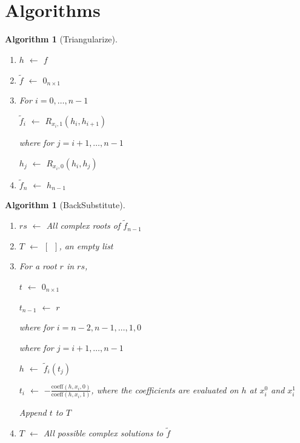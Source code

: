 \documentclass{article}%
\newtheorem{algorithm}[theorem]{Algorithm}
\begin{document}
\section{Algorithms}

\begin{algorithm}
[Triangularize]
\phantom{L}
\begin{enumerate}
    \item $h$ $\leftarrow$ $f$
    \item $\tilde{f}$ $\leftarrow$ $0_{n\times 1}$
    \item For $i=0,\dots,n-1$

    $\tilde{f}_i$ $\leftarrow$ $R_{x_i,1}(h_i,h_{i+1})$
    
    \hspace{25}where for $j=i+1,\dots,n-1$
    
    \hspace{25}$h_j$ $\leftarrow$ $R_{x_i,0}(h_i,h_j)$
    \item $\tilde{f}_n$ $\leftarrow$ $h_{n-1}$
\end{enumerate}
\end{algorithm}

\begin{algorithm}
[BackSubstitute]
\phantom{L}
\begin{enumerate}
    \item $rs$ $\leftarrow$ All complex roots of $\tilde{f}_{n-1}$
    \item $T$ $\leftarrow$ $[\phantom{0}]$, an empty list
    \item For a root $r$ in $rs$,

    $t$ $\leftarrow$ $0_{n\times1}$

    $t_{n-1}$ $\leftarrow$ $r$

    \hspace{25pt}where for $i=n-2,n-1,\dots,1,0$

    \hspace{50pt}where for $j=i+1,\dots,n-1$

    \hspace{50pt}$h$ $\leftarrow$ $\tilde{f}_i(t_j)$

    \hspace{25pt}$t_i$ $\leftarrow$ $-\frac{\text{coeff}(h,x_i,0)}{\text{coeff}(h,x_i,1)}$, where the coefficients are evaluated on $h$ at $x_i^0$ and $x_i^1$

    \hspace{25pt}Append $t$ to $T$

    \item $T$ $\leftarrow$ All possible complex solutions to $\tilde{f}$
\end{enumerate}
\end{algorithm}
\end{document}
